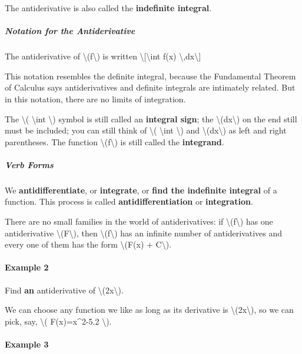 The antiderivative is also called the \textbf{indefinite integral}.

\hypertarget{notation-for-the-antiderivative}{%
\subparagraph{Notation for the
Antiderivative}\label{notation-for-the-antiderivative}}

The antiderivative of \textbackslash{}(f\textbackslash{}) is written
\textbackslash{}{[}\textbackslash{}int f(x)
\textbackslash{},dx\textbackslash{}{]}

This notation resembles the definite integral, because the Fundamental
Theorem of Calculus says antiderivatives and definite integrals are
intimately related. But in this notation, there are no limits of
integration.

The \textbackslash{}( \textbackslash{}int \textbackslash{}) symbol is
still called an \textbf{integral sign}; the
\textbackslash{}(dx\textbackslash{}) on the end still must be included;
you can still think of \textbackslash{}( \textbackslash{}int
\textbackslash{}) and \textbackslash{}(dx\textbackslash{}) as left and
right parentheses. The function \textbackslash{}(f\textbackslash{}) is
still called the \textbf{integrand}.

\hypertarget{verb-forms}{%
\subparagraph{Verb Forms}\label{verb-forms}}

We \textbf{antidifferentiate}, or \textbf{integrate}, or \textbf{find
the indefinite integral} of a function. This process is called
\textbf{antidifferentiation} or \textbf{integration}.

There are no small families in the world of antiderivatives: if
\textbackslash{}(f\textbackslash{}) has one antiderivative
\textbackslash{}(F\textbackslash{}), then
\textbackslash{}(f\textbackslash{}) has an infinite number of
antiderivatives and every one of them has the form \textbackslash{}(F(x)
+ C\textbackslash{}).

\hypertarget{example-2}{%
\paragraph{Example 2}\label{example-2}}

Find \textbf{an} antiderivative of \textbackslash{}(2x\textbackslash{}).

We can choose any function we like as long as its derivative is
\textbackslash{}(2x\textbackslash{}), so we can pick, say,
\textbackslash{}( F(x)=x\^{}2-5.2 \textbackslash{}).

\hypertarget{example-3}{%
\paragraph{Example 3}\label{example-3}}

